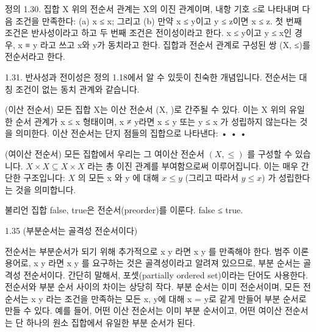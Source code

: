 \documentclass[11pt, a4paper, twoside, openany]{book}
\begin{document}
\tableofcontents
\clearpage


\begin{definitionbox}[]
정의 1.30. 집합 X 위의 전순서 관계는 X의 이진 관계이며, 내항 기호 ≤로 나타내며 다음 조건을 만족한다: (a) x ≤ x; 그리고 (b) 만약 x ≤ y이고 y ≤ z이면 x ≤ z. 첫 번째 조건은 반사성이라고 하고 두 번째 조건은 전이성이라고 한다. x ≤ y이고 y ≤ x인 경우, x ≡ y 라고 쓰고 x와 y가 동치라고 한다. 집합과 전순서 관계로 구성된 쌍 (X, ≤)를 전순서라고 한다.
\end{definitionbox}


1.31.  반사성과 전이성은 정의 1.18에서 알 수 있듯이 친숙한 개념입니다. 전순서는 대칭 조건이 없는 동치 관계와 같습니다.


\begin{examplebox}[Example  1.32]
(이산 전순서) 모든 집합 X는 이산 전순서 (X, )로 간주될 수 있다.  이는 X 위의 유일한 순서 관계가 x ≤ x 형태이며, x ≠ y라면 x ≤ y 또는 y ≤ x 가 성립하지 않는다는 것을 의미한다. 이산 전순서는 단지 점들의 집합으로 나타낸다: • • •
\end{examplebox}


\begin{examplebox}[Example  1.33]
(여이산 전순서) 모든 집합에서 우리는 그 여이산 전순서 $(X, \leq)$ 를 구성할 수 있습니다.  $X × X ⊆ X × X$ 라는 총 이진 관계를 부여함으로써 이루어집니다. 이는 매우 간단한 구조입니다: $X$ 의 모든 x 와 y 에 대해 $x ≤ y$ (그리고 따라서 $y ≤ x$) 가 성립한다는 것을 의미합니다.
\end{examplebox}


\begin{examplebox}[Example  1.34]
불리언 집합 {false, true}은 전순서(preorder)를 이룬다.  false ≤ true.
\end{examplebox}


1.35 (부분순서는 골격성 전순서이다)

전순서는 부분순서가 되기 위해 추가적으로 x  y 라면 x  y 를 만족해야 한다.  범주 이론 용어로, x  y 라면 x  y 를 요구하는 것은 골격성이라고 알려져 있으므로, 부분 순서는 골격성 전순서이다. 간단히 말해서, 포셋(partially ordered set)이라는 단어도 사용한다.  전순서와 부분 순서 사이의 차이는 상당히 작다. 부분 순서는 이미 전순서이며, 모든 전순서는 x  y 라는 조건을 만족하는 모든 x, y에 대해 x = y로 같게 만들어 부분 순서로 만들 수 있다. 예를 들어, 어떤 이산 전순서는 이미 부분 순서이고, 어떤 여이산 전순서는 단 하나의 원소 집합에서 유일한 부분 순서가 된다.
\end{document}
